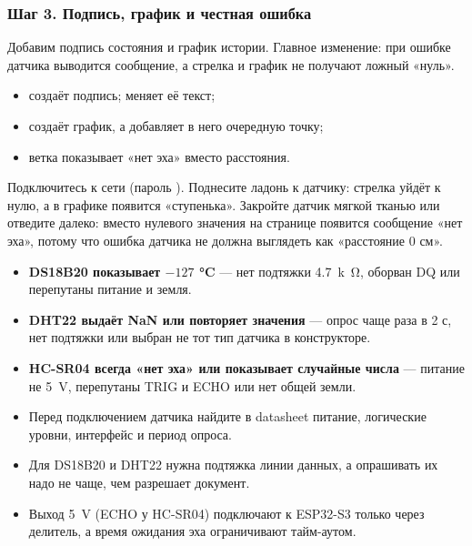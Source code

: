 \subsubsection{Шаг 3. Подпись, график и честная ошибка}

Добавим подпись состояния и график истории. Главное изменение: при ошибке датчика выводится сообщение,
а стрелка и график не получают ложный «нуль».


\begin{itemize}[leftmargin=*]
  \item {} создаёт подпись;  меняет её текст;
  \item {} создаёт график, а  добавляет в него очередную точку;
  \item ветка  показывает «нет эха» вместо расстояния.
\end{itemize}

Подключитесь к сети  (пароль ). Поднесите ладонь к датчику:
стрелка уйдёт к нулю, а в графике появится «ступенька». Закройте датчик мягкой тканью или
отведите далеко: вместо нулевого значения на странице появится сообщение «нет эха»,
потому что ошибка датчика не должна выглядеть как «расстояние 0 см».

\begin{trouble}
\begin{itemize}[leftmargin=*]
  \item \textbf{DS18B20 показывает $-127$ °C} --- нет подтяжки \SI{4.7}{k\ohm}, оборван DQ или перепутаны питание и земля.
  \item \textbf{DHT22 выдаёт NaN или повторяет значения} --- опрос чаще раза в 2 с, нет подтяжки или выбран не тот тип датчика в конструкторе.
  \item \textbf{HC-SR04 всегда «нет эха» или показывает случайные числа} --- питание не \SI{5}{V}, перепутаны TRIG и ECHO или нет общей земли.
\end{itemize}
\end{trouble}

\begin{summary}
\begin{itemize}[leftmargin=*]
  \item Перед подключением датчика найдите в datasheet питание, логические уровни, интерфейс и период опроса.
  \item Для DS18B20 и DHT22 нужна подтяжка линии данных, а опрашивать их надо не чаще, чем разрешает документ.
  \item Выход \SI{5}{V} (ECHO у HC-SR04) подключают к ESP32-S3 только через делитель, а время ожидания эха ограничивают тайм-аутом.
\end{itemize}
\end{summary}

